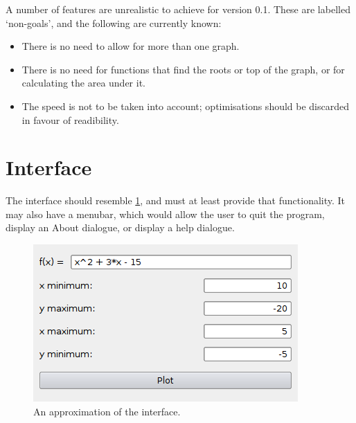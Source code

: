 \documentclass[12pt,a4paper]{article}
\begin{document}
		A number of features are unrealistic to achieve for version 0.1.  These are labelled `non-goals', and the following are currently known:
		\begin{itemize}
			\item There is no need to allow for more than one graph.
			\item There is no need for functions that find the roots or top of the graph, or for calculating the area under it.
			\item The speed is not to be taken into account; optimisations should be discarded in favour of readibility.
		\end{itemize}

	\section{Interface}
		The interface should resemble \ref{fig:interface1}, and must at least provide that functionality.  It may also have a menubar, which would allow the user to quit the program, display an About dialogue, or display a help dialogue.
		\begin{figure}[h]
			\label{fig:interface1}
			\centering
			    \includegraphics[width=\textwidth]{interface1.png}
			\caption{An approximation of the interface.}
		\end{figure}
\end{document}
